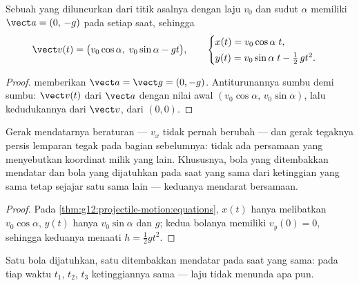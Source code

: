 \begin{theorem}\label{thm:g12:projectile-motion:equations}
Sebuah  yang diluncurkan dari titik asalnya dengan laju $v_0$ dan
sudut $\alpha$ memiliki $\vect a = (0,\,-g)$ pada setiap saat, sehingga
\[
\vect v(t) = \bigl(v_0\cos\alpha,\; v_0\sin\alpha - g t\bigr),
\qquad
\begin{cases}
x(t) = v_0\cos\alpha\; t,\\[2pt]
y(t) = v_0\sin\alpha\; t - \tfrac12\, g t^2 .
\end{cases}
\]
\end{theorem}

\begin{proof}
 memberikan $\vect a = \vect g = (0,-g)$. Antiturunannya
sumbu demi sumbu: $\vect v(t)$ dari $\vect a$ dengan nilai awal
$(v_0\cos\alpha,\, v_0\sin\alpha)$, lalu kedudukannya dari $\vect v$, dari $(0,0)$.
\end{proof}

\begin{proposition}\label{prop:g12:projectile-motion:independence}
Gerak mendatarnya beraturan --- $v_x$ tidak pernah berubah --- dan gerak
tegaknya persis lemparan tegak pada bagian sebelumnya: tidak ada persamaan
yang menyebutkan koordinat milik yang lain. Khususnya, bola yang ditembakkan
mendatar dan bola yang dijatuhkan pada saat yang sama dari ketinggian yang
sama tetap sejajar satu sama lain --- keduanya mendarat bersamaan.
\end{proposition}

\begin{proof}
Pada \cref{thm:g12:projectile-motion:equations}, $x(t)$ hanya melibatkan
$v_0\cos\alpha$, $y(t)$ hanya $v_0\sin\alpha$ dan $g$; kedua bolanya memiliki
$v_y(0) = 0$, sehingga keduanya menaati $h = \tfrac12 gt^2$.
\end{proof}

\begin{omfigure}

{\small Satu bola dijatuhkan, satu ditembakkan mendatar pada saat yang sama:
pada tiap waktu $t_1$, $t_2$, $t_3$ ketinggiannya sama --- laju tidak menunda apa pun.}
\end{omfigure}

